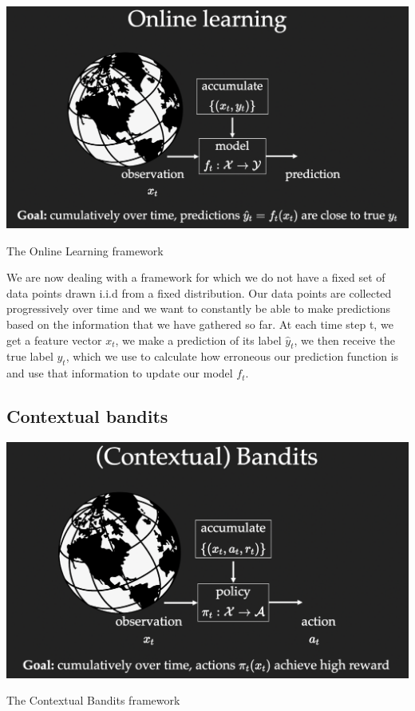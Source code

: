 \begin{marginfigure}%
  \includegraphics[width=\linewidth]{Online_Learning.png}
\caption{The Online Learning framework}
  \label{fig:online_learning_framework}
\end{marginfigure}

We are now dealing with a framework for which we do not have a fixed set of data points drawn i.i.d from a fixed distribution. Our data points are collected progressively over time and we want to constantly be able to make predictions based on the information that we have gathered so far. 
At each time step t, we get a feature vector $x_t$, we make a prediction of its label $\hat{y}_t$, we then receive the true label $y_t$, which we use to calculate how erroneous our prediction function is and use that information to update our model $f_t$.

\subsection*{Contextual bandits}
    
\begin{marginfigure}%
  \includegraphics[width=\linewidth]{Contextual_Bandits.png}
\caption{The Contextual Bandits framework}
  \label{fig:contextual_bandits_framework}
\end{marginfigure}
    

